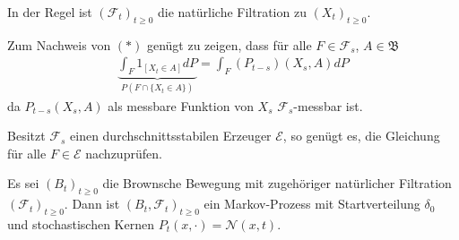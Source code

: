\documentclass[a4paper,twoside,DIV15,BCOR12mm]{scrbook}
\newcommand{\cF}{\mathcal F}
\newcommand{\borel}{{\mathfrak B}}
\begin{document}
\begin{bemerkung}
\begin{enuma}
\item In der Regel ist $(\cF_t)_{t\ge 0}$ die natürliche Filtration zu $(X_t)_{t\ge 0}$.
\item Zum Nachweis von $(*)$ genügt zu zeigen, dass für alle $F\in \cF_s$, $A\in \borel$
\begin{align*}
\underbrace{\int_F 1_{[X_t\in A]} dP}_{P(F\cap \{X_t\in A\})} = \int_F(P_{t-s})(X_s,A)dP
\end{align*}
da $P_{t-s}(X_s,A)$ als messbare Funktion von $X_s$ $\cF_s$-messbar ist.

Besitzt $\cF_s$ einen durchschnittsstabilen Erzeuger $\mathcal E$, so genügt es, die Gleichung für alle $F\in\mathcal E$ nachzuprüfen.
\end{enuma}
\end{bemerkung}

\begin{satz}
\label{satz:12.1}Es sei $(B_t)_{t\ge 0}$ die Brownsche Bewegung mit zugehöriger natürlicher Filtration $(\cF_t)_{t\ge 0}$. Dann ist $(B_t,\cF_t)_{t\ge 0}$ ein Markov-Prozess mit Startverteilung $\delta_0$ und stochastischen Kernen $P_t(x,\cdot)=\mathcal N(x,t)$.
\end{satz}
\end{document}
